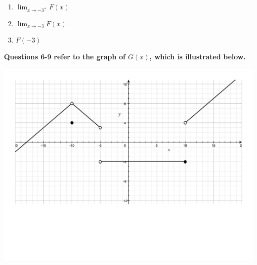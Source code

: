 \documentclass[12pt]{article}
\newif\ifans
\begin{document}
\begin{enumerate}
\begin{enumerate}
\item $\displaystyle \lim_{x \rightarrow -3^{+}}{F(x)}$

\ifans{\fbox{$-1$}} \fi

\item $\displaystyle \lim_{x \rightarrow -3}{F(x)}$

\ifans{\fbox{DNE because $\displaystyle \lim_{x \rightarrow -3^{-}}{F(x)} \neq \lim_{x \rightarrow -3^{+}}{F(x)}$}} \fi

\item $F(-3)$

\ifans{\fbox{$0$}} \fi

\end{enumerate}

\end{enumerate}

\newpage

{\bf Questions 6-9 refer to the graph of $G(x)$, which is illustrated below.}

\begin{center}
\includegraphics[scale=0.5]{Limits2.pdf}
\end{center}
\end{document}
